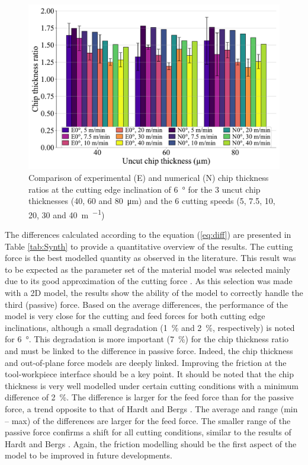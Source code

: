 \documentclass[preprint,12pt,times]{elsarticle}
\begin{document}
\begin{figure}[!h]
\centering
\includegraphics[width = 140 mm]{Figures/h6}
\caption{Comparison of experimental (E) and numerical (N) chip thickness ratios at the cutting edge inclination of \qty{6}{\degree} for the 3 uncut chip thicknesses (40, 60 and \qty{80}{\um}) and the 6 cutting speeds (5, 7.5, 10, 20, 30 and \qty{40}{\m\per\min})}
\label{fig:h6}
\end{figure}

The differences calculated according to the equation (\ref{eq:diff}) are presented in Table \ref{tab:Synth} to provide a quantitative overview of the results. The cutting force is the best modelled quantity as observed in the literature. This result was to be expected as the parameter set of the material model was selected mainly due to its good approximation of the cutting force \cite{ducobu_Importance_2017}. As this selection was made with a 2D model, the results show the ability of the model to correctly handle the third (passive) force. Based on the average differences, the performance of the model is very close for the cutting and feed forces for both cutting edge inclinations, although a small degradation (\qty{1}{\%} and \qty{2}{\%}, respectively) is noted for \qty{6}{\degree}. This degradation is more important (\qty{7}{\%}) for the chip thickness ratio and must be linked to the difference in passive force. Indeed, the chip thickness and out-of-plane force models are deeply linked. Improving the friction at the tool-workpiece interface should be a key point. It should be noted that the chip thickness is very well modelled under certain cutting conditions with a minimum difference of \qty{2}{\%}. The difference is larger for the feed force than for the passive force, a trend opposite to that of Hardt and Bergs \cite{hardt_Three_2021}. The average and range (min -- max) of the differences are larger for the feed force. The smaller range of the passive force confirms a shift for all cutting conditions, similar to the results of Hardt and Bergs \cite{hardt_Three_2021}. Again, the friction modelling should be the first aspect of the model to be improved in future developments.
\end{document}
